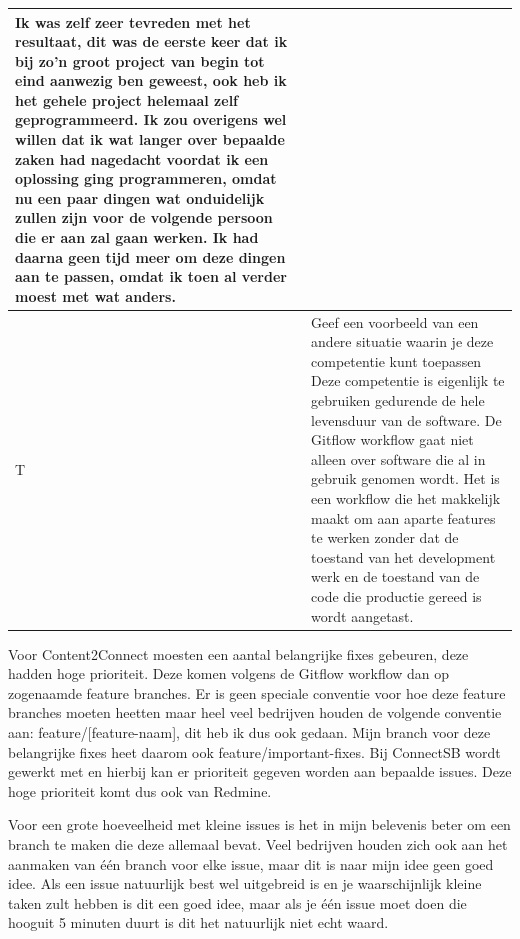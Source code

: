 \begin{tabularx}{\textwidth}{| l | X |}
\newline
Ik was zelf zeer tevreden met het resultaat, dit was de eerste keer dat ik bij zo'n groot project van begin tot eind aanwezig ben geweest, ook heb ik het gehele project helemaal zelf geprogrammeerd. Ik zou overigens wel willen dat ik wat langer over bepaalde zaken had nagedacht voordat ik een oplossing ging programmeren, omdat nu een paar dingen wat onduidelijk zullen zijn voor de volgende persoon die er aan zal gaan werken. Ik had daarna geen tijd meer om deze dingen aan te passen, omdat ik toen al verder moest met wat anders.
\\
\hline
T & Geef een voorbeeld van een andere situatie waarin je deze competentie kunt toepassen
\newline
\newline
Deze competentie is eigenlijk te gebruiken gedurende de hele levensduur van de software. De Gitflow workflow gaat niet alleen over software die al in gebruik genomen wordt. Het is een workflow die het makkelijk maakt om aan aparte features te werken zonder dat de toestand van het development werk en de toestand van de code die productie gereed is wordt aangetast.
\\
\hline
\end{tabularx}

\newline

Voor Content2Connect moesten een aantal belangrijke fixes gebeuren, deze hadden hoge prioriteit. Deze komen volgens de Gitflow workflow dan op zogenaamde feature branches. Er is geen speciale conventie voor hoe deze feature branches moeten heetten maar heel veel bedrijven houden de volgende conventie aan: feature/[feature-naam], dit heb ik dus ook gedaan. Mijn branch voor deze belangrijke fixes heet daarom ook feature/important-fixes. Bij ConnectSB wordt gewerkt met \cite{Redmine} en hierbij kan er prioriteit gegeven worden aan bepaalde issues. Deze hoge prioriteit komt dus ook van Redmine.

Voor een grote hoeveelheid met kleine issues is het in mijn belevenis beter om een branch te maken die deze allemaal bevat. Veel bedrijven houden zich ook aan het aanmaken van één branch voor elke issue, maar dit is naar mijn idee geen goed idee. Als een issue natuurlijk best wel uitgebreid is en je waarschijnlijk kleine taken zult hebben is dit een goed idee, maar als je één issue moet doen die hooguit 5 minuten duurt is dit het natuurlijk niet echt waard.

\newline

